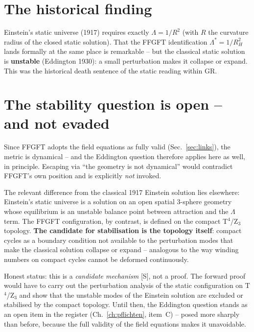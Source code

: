 \documentclass[11pt]{report}
\begin{document}
\section{The historical finding}

Einstein's static universe (1917) requires exactly
$\Lambda = 1/R^2$ (with $R$ the curvature radius of the closed
static solution). That the FFGFT identification
$\Lambda^{*} = 1/R_H^2$ lands formally at the same place is
remarkable -- but the classical static solution is
\textbf{unstable} (Eddington 1930): a small perturbation makes it
collapse or expand. This was the historical death sentence of the
static reading within GR.

\section{The stability question is open -- and not evaded}
\label{sec:stabfrage}

Since FFGFT adopts the field equations as fully valid (Sec.~\ref{sec:links}),
the metric is dynamical -- and the Eddington question therefore
applies here as well, in principle. Escaping via \enquote{the
geometry is not dynamical} would contradict FFGFT's own position and
is explicitly \emph{not} invoked.

The relevant difference from the classical 1917 Einstein solution
lies elsewhere: Einstein's static universe is a solution on an open
spatial 3-sphere geometry whose equilibrium is an unstable balance
point between attraction and the $\Lambda$ term. The FFGFT
configuration, by contrast, is defined on the compact
T$^4$/Z$_3$ topology. \textbf{The candidate for stabilisation is
the topology itself}: compact cycles as a boundary condition not
available to the perturbation modes that make the classical
solution collapse or expand -- analogous to the way winding numbers
on compact cycles cannot be deformed continuously.

Honest status: this is a \emph{candidate mechanism} [S], not a
proof. The forward proof would have to carry out the perturbation
analysis of the static configuration on T$^4$/Z$_3$ and show that
the unstable modes of the Einstein solution are excluded or
stabilised by the compact topology. Until then, the Eddington
question stands as an open item in the register (Ch.~\ref{ch:pflichten}, item~C) --
posed more sharply than before, because the full validity of the
field equations makes it unavoidable.

\end{document}
